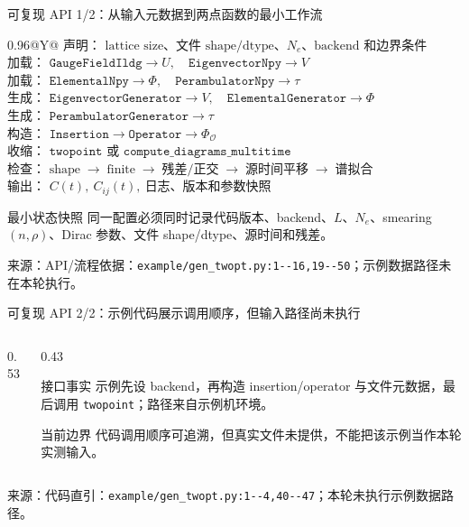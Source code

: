 \documentclass[UTF8,aspectratio=169,11pt]{ctexbeamer}
\newcommand{\source}[1]{%
  \vspace{0.06em}\par{\raggedright\scriptsize\color{muted}来源：#1\par}}
\newcommand{\codepath}[1]{\nolinkurl{#1}}
\begin{document}
\begin{frame}[t]{可复现 API 1/2：从输入元数据到两点函数的最小工作流}
  \centering
  \small
  \begin{tabularx}{0.96\linewidth}{@{}Y@{}}
    $\text{声明： lattice size、文件 shape/dtype、}N_e\text{、backend 和边界条件}$ \\
    $\text{加载： }\texttt{GaugeFieldIldg}\to U,\quad\texttt{EigenvectorNpy}\to V$ \\
    $\text{加载： }\texttt{ElementalNpy}\to\Phi,\quad\texttt{PerambulatorNpy}\to\tau$ \\
    $\text{生成： }\texttt{EigenvectorGenerator}\to V,\quad\texttt{ElementalGenerator}\to\Phi$ \\
    $\text{生成： }\texttt{PerambulatorGenerator}\to\tau$ \\
    $\text{构造： }\texttt{Insertion}\to\texttt{Operator}\to\Phi_{\mathcal O}$ \\
    $\text{收缩： }\texttt{twopoint}\text{ 或 }\texttt{compute\_diagrams\_multitime}$ \\
    $\text{检查： shape}\;\to\;\text{finite}\;\to\;\text{残差/正交}\;\to\;\text{源时间平移}\;\to\;\text{谱拟合}$ \\
    $\text{输出： }C(t),\ C_{ij}(t),\ \text{日志、版本和参数快照}$ \\
  \end{tabularx}
  \vspace{0.14cm}
  \begin{block}{最小状态快照}
    \small
    同一配置必须同时记录代码版本、backend、$L$、$N_e$、smearing $(n,\rho)$、Dirac 参数、文件 shape/dtype、源时间和残差。
  \end{block}
  \source{API/流程依据：\codepath{example/gen_twopt.py:1--16,19--50}；示例数据路径未在本轮执行。}
\end{frame}

\begin{frame}[t]{可复现 API 2/2：示例代码展示调用顺序，但输入路径尚未执行}
  \begin{columns}[T,totalwidth=\textwidth]
    \begin{column}{0.53\textwidth}
      
      \vspace{0.08cm}
      
    \end{column}
    \begin{column}{0.43\textwidth}
      \begin{block}{接口事实}
        \small
        示例先设 backend，再构造 insertion/operator 与文件元数据，最后调用 \texttt{twopoint}；路径来自示例机环境。
      \end{block}
      \begin{alertblock}{当前边界}
        \small
        代码调用顺序可追溯，但真实文件未提供，不能把该示例当作本轮实测输入。
      \end{alertblock}
    \end{column}
  \end{columns}
  \source{代码直引：\codepath{example/gen_twopt.py:1--4,40--47}；本轮未执行示例数据路径。}
\end{frame}
\end{document}
